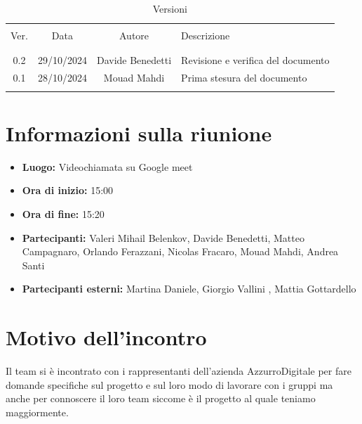 \documentclass[italian, 12pt]{article}
\begin{document}
\pagestyle{mystyle}


\begin{table}[!h]
	\caption{Versioni}
	\begin{center}
		\begin{tabular}{ c c c p{9cm}}
			\hline \\[-2ex]
			Ver. & Data & Autore & Descrizione \\
			\\[-2ex] \hline \\[-1.5ex]
            0.2 & 29/10/2024 & Davide Benedetti & Revisione e verifica del documento\\
			0.1 & 28/10/2024 & Mouad Mahdi & Prima stesura del documento\\
			\\[-1.5ex] \hline
		\end{tabular}
	\end{center}
\end{table}


\tableofcontents
\newpage


\section{Informazioni sulla riunione}
\begin{itemize}
    \item \textbf{Luogo:} Videochiamata su Google meet
    \item \textbf{Ora di inizio:} 15:00
    \item \textbf{Ora di fine:} 15:20
    \item \textbf{Partecipanti:} Valeri Mihail Belenkov, Davide Benedetti, Matteo Campagnaro, Orlando Ferazzani, Nicolas Fracaro, Mouad Mahdi, Andrea Santi 
    \item \textbf{Partecipanti esterni:} Martina Daniele, Giorgio Vallini , Mattia Gottardello
\end{itemize}

\section{Motivo dell'incontro}
Il team si è incontrato con i rappresentanti dell'azienda AzzurroDigitale per fare domande specifiche sul progetto e sul loro modo di lavorare con i gruppi ma anche per connoscere il loro team siccome è il progetto al quale teniamo maggiormente.
\end{document}
